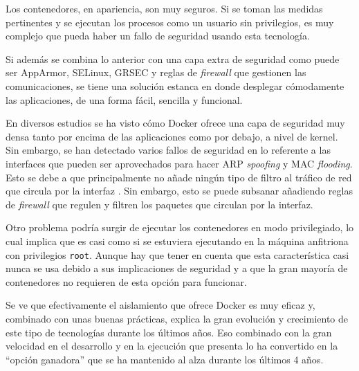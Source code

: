 Los contenedores, en apariencia, son muy seguros. Si se toman las medidas 
pertinentes y se ejecutan los procesos como un usuario sin privilegios, es
muy complejo que pueda haber un fallo de seguridad usando esta tecnología.

Si además se combina lo anterior con una capa extra de seguridad como puede
ser AppArmor, SELinux, GRSEC y reglas de \textit{firewall} que gestionen las
comunicaciones, se tiene una solución estanca en donde desplegar
cómodamente las aplicaciones, de una forma fácil, sencilla y funcional.

En diversos estudios se ha visto cómo Docker ofrece una capa de seguridad
muy densa tanto por encima de las aplicaciones como por debajo, a nivel de
kernel. Sin embargo, se han detectado varios fallos de seguridad en lo
referente a las interfaces que pueden ser aprovechados para hacer ARP
\textit{spoofing} y MAC \textit{flooding}. Esto se debe a que principalmente
no añade ningún tipo de filtro al tráfico de red que circula por la interfaz
\autocite{buiAnalysisDockerSecurity2015}. Sin embargo, esto se puede subsanar
añadiendo reglas de \textit{firewall} que regulen y filtren los paquetes que
circulan por la interfaz.

Otro problema podría surgir de ejecutar los contenedores en modo privilegiado,
lo cual implica que es casi como si se estuviera ejecutando en la máquina
anfitriona con privilegios \texttt{root}. Aunque hay que tener en cuenta que
esta característica casi nunca se usa debido a sus implicaciones de seguridad
y a que la gran mayoría de contenedores no requieren de esta opción para
funcionar.

Se ve que efectivamente el aislamiento que ofrece Docker es muy eficaz y, 
combinado con unas buenas prácticas, explica la gran evolución y crecimiento
de este tipo de tecnologías durante los últimos años. Eso combinado con la
gran velocidad en el desarrollo y en la ejecución que presenta lo ha convertido
en la ``opción ganadora'' que se ha mantenido al alza durante los últimos 4 años.